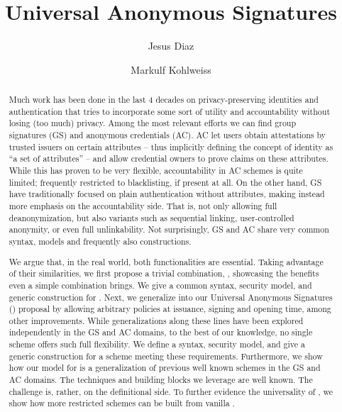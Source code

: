 \documentclass{llncs}%
\title{Universal Anonymous Signatures}
\author{Jesus Diaz\inst{1} \and Markulf Kohlweiss\inst{2}}
\institute{Input Output Global,\\
\email{jesus.diazvico@iohk.io},\\
\and
Input Output Global and University of Edinburgh,\\
\email{markulf.kohlweiss@ed.ac.uk}}
\begin{document}
{\def\addcontentsline#1#2#3{}\maketitle}%


\begin{abstract}
  Much work has been done in the last 4 decades on privacy-preserving
  identities and authentication that tries to incorporate some sort of utility
  and accountability without losing (too much) privacy. Among the most relevant
  efforts we can find group signatures (GS) and anonymous credentials (AC).
  AC let users obtain attestations by trusted
  issuers on certain attributes -- thus implicitly defining the concept of
  identity as ``a set of attributes'' -- and allow credential owners to prove
  claims on these attributes. While this has proven to be very
  flexible, accountability in AC schemes is quite limited; frequently restricted
  to blacklisting, if present at all.
  On the other hand, GS have traditionally focused on plain authentication
  without attributes, making instead more emphasis on the accountability side.
  That is, not only allowing full
  deanonymization, but also variants such as sequential linking, user-controlled
  anonymity, or even full unlinkability.
  Not surprisingly, GS and AC share very common syntax, models and frequently
  also constructions.

  We argue that, in the real world, both functionalities are essential. Taking
  advantage of their similarities, we first propose a trivial combination,
  \GSAC, showcasing the benefits even a simple combination brings. We give a
  common syntax, security model, and generic construction for \GSAC.
  Next, we generalize \GSAC into our Universal Anonymous Signatures (\UAS)
  proposal by allowing arbitrary policies at issuance, signing and opening
  time, among other improvements. While generalizations along these
  lines have been explored independently in the GS and AC domains, to the best
  of our knowledge, no single scheme offers such full flexibility.
  We define a syntax, security model, and give a generic construction for a
  scheme meeting these requirements. Furthermore, we show how our model for
  \UAS is a generalization of previous well known schemes in the GS and AC
  domains.
  The techniques and building blocks we leverage are well known. The challenge
  is, rather, on the definitional side. To further evidence the universality of
  \UAS, we show how more restricted schemes can be built from vanilla \UAS.
\end{abstract}

\tableofcontents





%





\appendix



\end{document}
